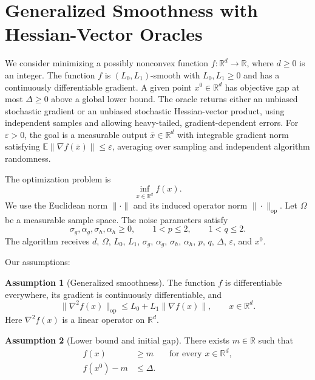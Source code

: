 \documentclass[10pt]{article}
\theoremstyle{definition}
\newtheorem{assumption}{Assumption}
\begin{document}
\section*{Generalized Smoothness with Hessian-Vector Oracles}
We consider minimizing a possibly nonconvex function $f:\mathbb{R}^d\to\mathbb{R}$, where $d\geq0$ is an integer. The function $f$ is $(L_0,L_1)$-smooth with $L_0,L_1\geq0$ and has a continuously differentiable gradient. A given point $x^0\in\mathbb{R}^d$ has objective gap at most $\Delta\geq0$ above a global lower bound. The oracle returns either an unbiased stochastic gradient or an unbiased stochastic Hessian-vector product, using independent samples and allowing heavy-tailed, gradient-dependent errors. For $\varepsilon>0$, the goal is a measurable output $\bar{x}\in\mathbb{R}^d$ with integrable gradient norm satisfying $\mathbb{E}\|\nabla f(\bar{x})\|\leq\varepsilon$, averaging over sampling and independent algorithm randomness.

The optimization problem is
\[
\inf_{x\in\mathbb{R}^d} f(x).
\]
We use the Euclidean norm $\|\cdot\|$ and its induced operator norm $\|\cdot\|_{\mathrm{op}}$. Let $\Omega$ be a measurable sample space. The noise parameters satisfy
\[
\sigma_g,\alpha_g,\sigma_h,\alpha_h\geq0,
\qquad 1<p\leq2,\qquad 1<q\leq2.
\]
The algorithm receives $d$, $\Omega$, $L_0$, $L_1$, $\sigma_g$, $\alpha_g$, $\sigma_h$, $\alpha_h$, $p$, $q$, $\Delta$, $\varepsilon$, and $x^0$.

Our assumptions:
\begin{assumption}[Generalized smoothness]
The function $f$ is differentiable everywhere, its gradient is continuously differentiable, and
\[
\|\nabla^2 f(x)\|_{\mathrm{op}}
\leq L_0+L_1\|\nabla f(x)\|,
\qquad x\in\mathbb{R}^d.
\]
Here $\nabla^2 f(x)$ is a linear operator on $\mathbb{R}^d$.
\end{assumption}

\begin{assumption}[Lower bound and initial gap]
There exists $m\in\mathbb{R}$ such that
\[
\begin{aligned}
f(x)&\geq m &&\text{for every }x\in\mathbb{R}^d,\\
f(x^0)-m&\leq\Delta.
\end{aligned}
\]
\end{assumption}
\end{document}
